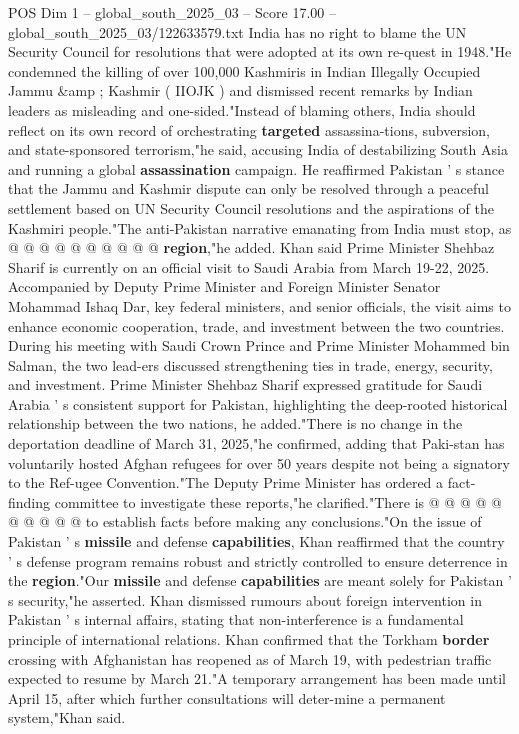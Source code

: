 \begin{textsample}{POS Dim 1 – global\_south\_2025\_03 – Score 17.00 – global\_south\_2025\_03/122633579.txt}
India has no right to blame the UN Security Council for resolutions that were adopted at its own re-quest in 1948."He condemned the killing of over 100,000 Kashmiris in Indian Illegally Occupied Jammu \&amp ; Kashmir ( IIOJK ) and dismissed recent remarks by Indian leaders as misleading and one-sided."Instead of blaming others, India should reflect on its own record of orchestrating \textbf{targeted} assassina-tions, subversion, and state-sponsored terrorism,"he said, accusing India of destabilizing South Asia and running a global \textbf{assassination} campaign.
He reaffirmed Pakistan ' s stance that the Jammu and Kashmir dispute can only be resolved through a peaceful settlement based on UN Security Council resolutions and the aspirations of the Kashmiri people."The anti-Pakistan narrative emanating from India must stop, as @ @ @ @ @ @ @ @ @ @ \textbf{region},"he added.
Khan said Prime Minister Shehbaz Sharif is currently on an official visit to Saudi Arabia from March 19-22, 2025.
Accompanied by Deputy Prime Minister and Foreign Minister Senator Mohammad Ishaq Dar, key federal ministers, and senior officials, the visit aims to enhance economic cooperation, trade, and investment between the two countries.
During his meeting with Saudi Crown Prince and Prime Minister Mohammed bin Salman, the two lead-ers discussed strengthening ties in trade, energy, security, and investment.
Prime Minister Shehbaz Sharif expressed gratitude for Saudi Arabia ' s consistent support for Pakistan, highlighting the deep-rooted historical relationship between the two nations, he added."There is no change in the deportation deadline of March 31, 2025,"he confirmed, adding that Paki-stan has voluntarily hosted Afghan refugees for over 50 years despite not being a signatory to the Ref-ugee Convention."The Deputy Prime Minister has ordered a fact-finding committee to investigate these reports,"he clarified."There is @ @ @ @ @ @ @ @ @ @ to establish facts before making any conclusions."On the issue of Pakistan ' s \textbf{missile} and defense \textbf{capabilities}, Khan reaffirmed that the country ' s defense program remains robust and strictly controlled to ensure deterrence in the \textbf{region}."Our \textbf{missile} and defense \textbf{capabilities} are meant solely for Pakistan ' s security,"he asserted.
Khan dismissed rumours about foreign intervention in Pakistan ' s internal affairs, stating that non-interference is a fundamental principle of international relations.
Khan confirmed that the Torkham \textbf{border} crossing with Afghanistan has reopened as of March 19, with pedestrian traffic expected to resume by March 21."A temporary arrangement has been made until April 15, after which further consultations will deter-mine a permanent system,"Khan said.

\end{textsample}

